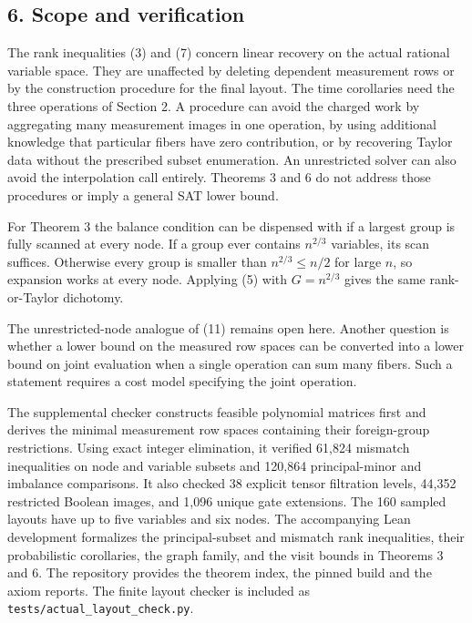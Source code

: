 \documentclass[
  10pt,
]{article}
\begin{document}
\subsection{6. Scope and verification}\label{scope-and-verification}

The rank inequalities (3) and (7) concern linear recovery on the actual
rational variable space. They are unaffected by deleting dependent
measurement rows or by the construction procedure for the final layout.
The time corollaries need the three operations of Section 2. A procedure
can avoid the charged work by aggregating many measurement images in one
operation, by using additional knowledge that particular fibers have
zero contribution, or by recovering Taylor data without the prescribed
subset enumeration. An unrestricted solver can also avoid the
interpolation call entirely. Theorems 3 and 6 do not address those
procedures or imply a general SAT lower bound.

For Theorem 3 the balance condition can be dispensed with if a largest
group is fully scanned at every node. If a group ever contains
\(n^{2/3}\) variables, its scan suffices. Otherwise every group is
smaller than \(n^{2/3}\le n/2\) for large \(n\), so expansion works at
every node. Applying (5) with \(G=n^{2/3}\) gives the same
rank-or-Taylor dichotomy.

The unrestricted-node analogue of (11) remains open here. Another
question is whether a lower bound on the measured row spaces can be
converted into a lower bound on joint evaluation when a single operation
can sum many fibers. Such a statement requires a cost model specifying
the joint operation.

The supplemental checker constructs feasible polynomial matrices first
and derives the minimal measurement row spaces containing their
foreign-group restrictions. Using exact integer elimination, it verified
61,824 mismatch inequalities on node and variable subsets and 120,864
principal-minor and imbalance comparisons. It also checked 38 explicit
tensor filtration levels, 44,352 restricted Boolean images, and 1,096
unique gate extensions. The 160 sampled layouts have up to five
variables and six nodes. The accompanying Lean development formalizes the principal-subset and
mismatch rank inequalities, their probabilistic corollaries, the graph
family, and the visit bounds in Theorems 3 and 6. The repository
provides the theorem index, the pinned build and the axiom reports.
The finite layout checker is included as
\texttt{tests/actual\_layout\_check.py}.
\end{document}
